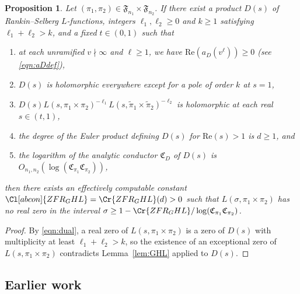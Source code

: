 \documentclass[11pt]{amsart}
\newtheorem{proposition}[theorem]{Proposition}
\theoremstyle{remark}
\newcommand{\re}{\mathrm{Re}}
\numberwithin{equation}{section}
\begin{document}
\begin{proposition}
\label{prop:strategy}
Let $(\pi_1,\pi_2)\in\mathfrak{F}_{n_1}\times\mathfrak{F}_{n_2}$.  If there exist a product $D(s)$ of Rankin--Selberg $L$-functions, integers $\ell_1,\ell_2\geq 0$ and $k\geq 1$ satisfying $\ell_1+\ell_2>k$, and a fixed $t\in(0,1)$ such that
\begin{enumerate}
	\item at each unramified $v\nmid\infty$ and $\ell\geq 1$, we have $\mathrm{Re}(a_D(v^{\ell}))\geq 0$ (see \eqref{eqn:aDdef}),
	\item $D(s)$ is holomorphic everywhere except for a pole of order $k$ at $s=1$,
	\item $D(s) L(s,\pi_1\times\pi_2)^{-\ell_1}L(s,\widetilde{\pi}_1\times\widetilde{\pi}_2)^{-\ell_2}$ is holomorphic at each real $s\in(t,1)$,
    \item the degree of the Euler product defining $D(s)$ for $\re(s)>1$ is $d\geq 1$, and
    \item the logarithm of the analytic conductor $\mathfrak{C}_D$ of $D(s)$ is $O_{n_1,n_2}(\log(\mathfrak{C}_{\pi_1}\mathfrak{C}_{\pi_2}))$,
\end{enumerate}
then there exists an effectively computable constant $\Cl[abcon]{ZFR_GHL}=\Cr{ZFR_GHL}(d)>0$ such that $L(\sigma,\pi_1\times\pi_2)$ has no real zero in the interval $\sigma\geq 1-\Cr{ZFR_GHL}/\log(\mathfrak{C}_{\pi_1}\mathfrak{C}_{\pi_2})$.
\end{proposition}
\begin{proof}
By \eqref{eqn:dual}, a real zero of $L(s,\pi_1\times\pi_2)$ is a zero of $D(s)$ with multiplicity at least $\ell_1+\ell_2>k$, so the existence of an exceptional zero of $L(s,\pi_1\times\pi_2)$ contradicts Lemma~\ref{lem:GHL} applied to $D(s)$.
\end{proof}


\subsection{Earlier work}
\label{subsec:earlier_work}
\end{document}
